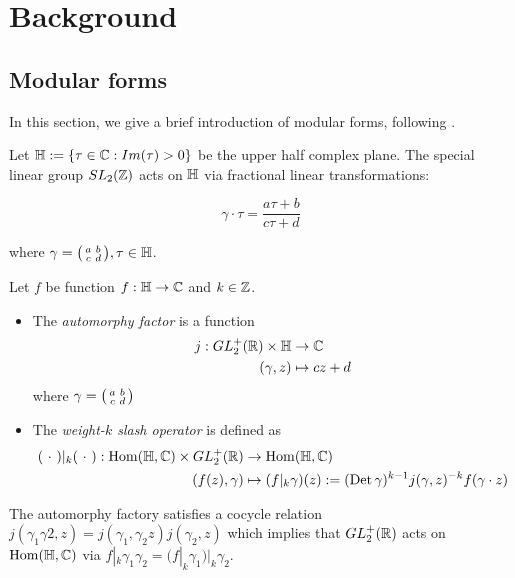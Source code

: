 \section{Background}

\subsection{Modular forms}

In this section, we give a brief introduction of modular forms, following \cite{Shurman}.

Let $\mathbb{H} := \{ \tau \in \mathbb{C}: Im(\tau) > 0 \}$ be the upper half complex plane. The special linear group $SL_2(\mathbb{Z})$ acts on $\mathbb{H}$ via fractional linear transformations:

\[
\gamma \cdot \tau = \frac{a\tau + b}{c \tau + d}
\] 

where $\gamma = \begin{psmallmatrix} a & b \\ c & d \end{psmallmatrix}, \tau \in \mathbb{H}$. 

\begin{defn}
Let $f$ be function $f: \mathbb{H} \rightarrow \mathbb{C}$ and $k \in \mathbb{Z}$. 

\begin{itemize}
    \item The \textit{automorphy factor} is a function \begin{align*}j: GL_2^+(\mathbb{R}) \times \mathbb{H} &\rightarrow \mathbb{C} \\ (\gamma,z) &\mapsto cz+d \end{align*}
    where $\gamma = \begin{psmallmatrix} a & b \\ c & d \end{psmallmatrix}$
    \item The \textit{weight-$k$ slash operator} is defined as 
    \begin{align*}
( \ \cdot \ )|_k (\ \cdot \ ): \operatorname{Hom}(\mathbb{H},\mathbb{C}) \times GL_2^+(\mathbb{R}) &\rightarrow \operatorname{Hom}(\mathbb{H},\mathbb{C}) \\
(f(z),\gamma) &\mapsto (f|_k \gamma)(z) := (\operatorname{Det} \gamma)^{k-1} j(\gamma,z)^{-k} f(\gamma \cdot z)
    \end{align*}
    \end{itemize}
\end{defn}

The automorphy factory satisfies a cocycle relation $j(\gamma_1\gamma2,z) = j(\gamma_1,\gamma_2 z)j(\gamma_2,z)$ which implies that $GL_2^+(\mathbb{R})$ acts on $\operatorname{Hom}(\mathbb{H},\mathbb{C})$ via $f|_k\gamma_1\gamma_2 = (f|_k\gamma_1)|_k\gamma_2$.

